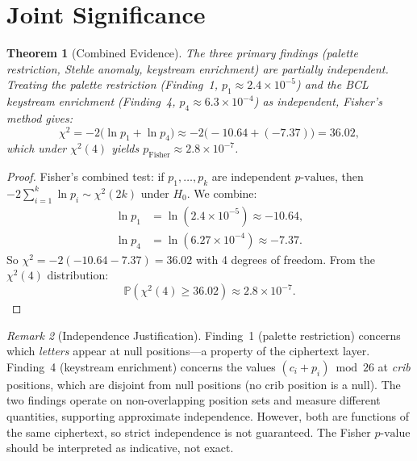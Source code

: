 \documentclass[11pt]{article}
\theoremstyle{plain}
\newtheorem{theorem}{Theorem}[section]
\theoremstyle{definition}
\theoremstyle{remark}
\newtheorem{remark}[theorem]{Remark}
\newcommand{\Prob}{\mathbb{P}}
\newcommand{\pvalue}{p\text{-value}}
\begin{document}
\section{Joint Significance}
\label{sec:joint}

\begin{theorem}[Combined Evidence]
\label{thm:combined}
The three primary findings (palette restriction, Stehle anomaly, keystream enrichment) are partially independent. Treating the palette restriction (Finding~1, $p_1 \approx 2.4 \times 10^{-5}$) and the BCL keystream enrichment (Finding~4, $p_4 \approx 6.3 \times 10^{-4}$) as independent, Fisher's method gives:
\begin{equation}
\chi^2 = -2\bigl(\ln p_1 + \ln p_4\bigr) \approx -2\bigl(-10.64 + (-7.37)\bigr) = 36.02,
\label{eq:fisher}
\end{equation}
which under $\chi^2(4)$ yields $p_{\text{Fisher}} \approx 2.8 \times 10^{-7}$.
\end{theorem}

\begin{proof}
Fisher's combined test: if $p_1, \ldots, p_k$ are independent $\pvalue$s, then $-2\sum_{i=1}^{k} \ln p_i \sim \chi^2(2k)$ under $H_0$. We combine:
\begin{align}
\ln p_1 &= \ln(2.4 \times 10^{-5}) \approx -10.64, \\
\ln p_4 &= \ln(6.27 \times 10^{-4}) \approx -7.37.
\end{align}
So $\chi^2 = -2(-10.64 - 7.37) = 36.02$ with 4 degrees of freedom. From the $\chi^2(4)$ distribution:
\begin{equation}
\Prob(\chi^2(4) \geq 36.02) \approx 2.8 \times 10^{-7}.
\end{equation}
\end{proof}

\begin{remark}[Independence Justification]
Finding~1 (palette restriction) concerns which \emph{letters} appear at null positions---a property of the ciphertext layer. Finding~4 (keystream enrichment) concerns the values $(c_i + p_i) \bmod 26$ at \emph{crib} positions, which are disjoint from null positions (no crib position is a null). The two findings operate on non-overlapping position sets and measure different quantities, supporting approximate independence. However, both are functions of the same ciphertext, so strict independence is not guaranteed. The Fisher $\pvalue$ should be interpreted as indicative, not exact.
\end{remark}
\end{document}

